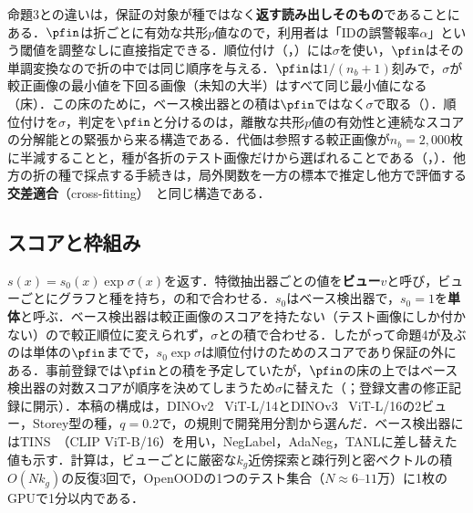 命題3との違いは，保証の対象が種ではなく\textbf{返す読み出しそのもの}であることにある．$\pfin$は折ごとに有効な共形$p$値なので，利用者は「IDの誤警報率$\alpha$」という閾値を調整なしに直接指定できる．順位付け（\AUC{}，\FPR{}）には$\sigma$を使い，$\pfin$はその単調変換なので折の中では同じ順序を与える．$\pfin$は$1/(n_b+1)$刻みで，$\sigma$が較正画像の最小値を下回る画像（未知の大半）はすべて同じ最小値になる（床）．この床のために，ベース検出器との積は$\pfin$ではなく$\sigma$で取る（）．順位付けを$\sigma$，判定を$\pfin$と分けるのは，離散な共形$p$値の有効性と連続なスコアの分解能との緊張から来る構造である．代価は参照する較正画像が$n_b{=}2{,}000$枚に半減することと，種が各折のテスト画像だけから選ばれることである（，）．他方の折の種で採点する手続きは，局外関数を一方の標本で推定し他方で評価する\textbf{交差適合}（cross-fitting）~\cite{chernozhukov2018dml}と同じ構造である．

\subsection{スコアと枠組み}
\label{sec:score}
$s(x)=s_0(x)\exp\sigma(x)$を返す．特徴抽出器ごとの値を\textbf{ビュー}$v$と呼び，ビューごとにグラフと種を持ち，の和で合わせる．$s_0$はベース検出器で，$s_0{=}1$を\textbf{単体}と呼ぶ．ベース検出器は較正画像のスコアを持たない（テスト画像にしか付かない）ので較正順位に変えられず，$\sigma$との積で合わせる．したがって命題4が及ぶのは単体の$\pfin$までで，$s_0\exp\sigma$は順位付けのためのスコアであり保証の外にある．事前登録では$\pfin$との積を予定していたが，$\pfin$の床の上ではベース検出器の対数スコアが順序を決めてしまうため$\sigma$に替えた（；登録文書の修正記録に開示）．本稿の構成は，DINOv2~\cite{oquab2024dinov2} ViT-L/14とDINOv3~\cite{simeoni2025dinov3} ViT-L/16の2ビュー，Storey型の種，$q{=}0.2$で，の規則で開発用分割から選んだ．ベース検出器にはTINS~\cite{yang2026tins}（CLIP ViT-B/16）を用い，NegLabel，AdaNeg，TANLに差し替えた値も示す．計算は，ビューごとに厳密な$k_g$近傍探索と疎行列と密ベクトルの積$O(Nk_g)$の反復3回で，OpenOODの1つのテスト集合（$N\approx6$--$11$万）に1枚のGPUで1分以内である．

